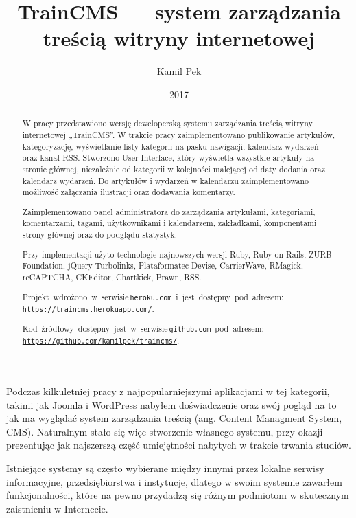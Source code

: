 \documentclass[openright]{xmgr}
\author   {Kamil Pek}
\title    {TrainCMS --- system zarządzania treścią witryny internetowej}
\date     {2017}
\begin{document}
\begin{abstract}
W pracy przedstawiono wersję deweloperską systemu zarządzania treścią witryny internetowej „TrainCMS”. W trakcie pracy zaimplementowano publikowanie artykułów, kategoryzację, wyświetlanie listy kategorii na pasku nawigacji, kalendarz wydarzeń oraz kanał RSS. Stworzono User Interface, który wyświetla wszystkie artykuły na stronie głównej, niezależnie od kategorii w kolejności malejącej od daty dodania oraz kalendarz wydarzeń. Do artykułów i wydarzeń w kalendarzu zaimplementowano możliwość załączania ilustracji oraz dodawania komentarzy.

Zaimplementowano panel administratora do zarządzania artykułami, kategoriami, komentarzami, tagami, użytkownikami i kalendarzem, zakładkami, komponentami strony głównej oraz do podglądu statystyk.

Przy implementacji użyto technologie najnowszych wersji Ruby, Ruby on Rails, ZURB Foundation, jQuery Turbolinks, Plataformatec Devise, CarrierWave, RMagick, reCAPTCHA, CKEditor, Chartkick, Prawn, RSS.

\mbox{Projekt wdrożono w serwisie\, \\\texttt{heroku.com} i jest dostępny pod adresem:} \\\texttt{\url{https://traincms.herokuapp.com/}}.

\mbox{Kod źródłowy dostępny jest w serwisie\, \\\texttt{github.com} pod adresem:} \\\texttt{\url{https://github.com/kamilpek/traincms/}}.
\end{abstract}


\maketitle

\introduction
Podczas kilkuletniej pracy z najpopularniejszymi aplikacjami w tej kategorii, takimi jak Joomla i WordPress nabyłem doświadczenie oraz swój pogląd na to jak ma wyglądać system zarządzania treścią (ang. Content Managment System, CMS). Naturalnym stało się więc stworzenie własnego systemu, przy okazji prezentując jak najszerszą część umiejętności nabytych w trakcie trwania studiów.

Istniejące systemy są często wybierane między innymi przez lokalne serwisy informacyjne, przedsiębiorstwa i instytucje, dlatego w swoim systemie zawarłem funkcjonalności, które na pewno przydadzą się różnym podmiotom w skutecznym zaistnieniu w Internecie.
\end{document}
